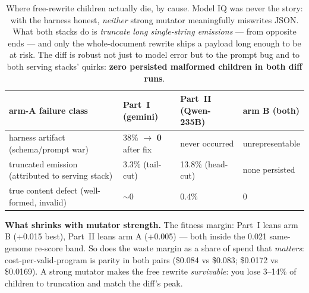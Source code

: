 \documentclass[11pt]{article}
\newcommand{\armA}{\textcolor{bad}{arm A}}
\newcommand{\armB}{\textcolor{accent}{arm B}}
\begin{document}
\begin{table}[H]\centering\footnotesize
\begin{tabular}{llll}
\toprule
arm-A failure class & Part~I (gemini) & Part~II (Qwen-235B) & \armB{} (both) \\
\midrule
harness artifact (schema/prompt war) & 38\% $\to$ \textbf{0} after fix & never occurred & unrepresentable \\
truncated emission (attributed to serving stack) & 3.3\% (tail-cut) & 13.8\% (head-cut) & none persisted \\
true content defect (well-formed, invalid) & $\sim$0 & 0.4\% & 0 \\
\bottomrule
\end{tabular}
\caption{Where free-rewrite children actually die, by cause. Model IQ was never the story: with
the harness honest, \emph{neither} strong mutator meaningfully miswrites JSON. What both stacks
do is \emph{truncate long single-string emissions} --- from opposite ends --- and only the
whole-document rewrite ships a payload long enough to be at risk. The diff is robust not just to
model error but to the prompt bug and to both serving stacks' quirks: \textbf{zero persisted
malformed children in both diff runs}.}
\end{table}

\noindent\textbf{What shrinks with mutator strength.} The fitness margin: Part~I leans \armB{}
(+0.015 best), Part~II leans \armA{} (+0.005) --- both inside the 0.021 same-genome re-score
band. So does the waste margin as a share of spend that \emph{matters}: cost-per-valid-program
is parity in both pairs (\$0.084 vs \$0.083; \$0.0172 vs \$0.0169). A strong mutator makes the
free rewrite \emph{survivable}: you lose 3--14\% of children to truncation and match the diff's
peak.
\end{document}
